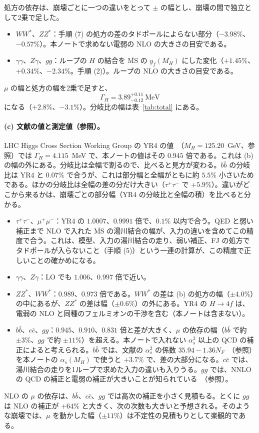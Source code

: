 \documentclass[a4paper,10pt]{ltjsarticle}
\newcommand{\MSbar}{\overline{\mathrm{MS}}}
\begin{document}
処方の依存は、崩壊ごとに一つの違いをとって $\pm$ の幅とし、崩壊の間で独立として2乗で足した。
\begin{itemize}
\item $WW^*$、$ZZ^*$：手順 (7) の処方の差のタドポールによらない部分（$-3.98\%$、$-0.57\%$）。本ノートで求めない電弱の NLO の大きさの目安である。
\item $\gamma\gamma$、$Z\gamma$、$gg$：ループの $H$ の結合を $\MSbar$ の $y_f(M_H)$ にした変化（$+1.45\%$、$+0.34\%$、$-2.34\%$。手順 (2)）。ループの NLO の大きさの目安である。
\end{itemize}
$\mu$ の幅と処方の幅を2乗で足すと、
\begin{equation}
\Gamma_H=3.89^{+0.11}_{-0.12}~\mathrm{MeV}
\label{eq:gammah}
\end{equation}
になる（$+2.8\%$、$-3.1\%$）。分岐比の幅は表~\ref{tab:total} にある。

\paragraph{(c) 文献の値と測定値（参照）。}LHC Higgs Cross Section Working Group の YR4 の値~\cite{yr4}（$M_H=125.20$~GeV、参照）では $\Gamma_H=4.115$~MeV で、本ノートの値はその $0.945$ 倍である。これは (b) の幅の外にある。分岐比は全幅で割るので、比べると見方が変わる。$b\bar b$ の分岐比は YR4 と $0.07\%$ で合うが、これは部分幅と全幅がともに約 $5.5\%$ 小さいためである。ほかの分岐比は全幅の差の分だけ大きい（$\tau^+\tau^-$ で $+5.9\%$）。違いがどこから来るかは、崩壊ごとの部分幅（YR4 の分岐比と全幅の積）を比べると分かる。
\begin{itemize}
\item $\tau^+\tau^-$、$\mu^+\mu^-$：YR4 の $1.0007$、$0.9991$ 倍で、$0.1\%$ 以内で合う。QED と弱い補正まで NLO で入れた $\MSbar$ の湯川結合の幅が、入力の違いを含めてこの精度で合う。これは、模型、入力の湯川結合の走り、弱い補正、FJ の処方でタドポールが入らないこと（手順 (5)）という一連の計算が、この精度で正しいことの確かめになる。
\item $\gamma\gamma$、$Z\gamma$：LO でも $1.006$、$0.997$ 倍で近い。
\item $ZZ^*$、$WW^*$：$0.989$、$0.973$ 倍である。$WW^*$ の差は (b) の処方の幅（$\pm4.0\%$）の中にあるが、$ZZ^*$ の差は幅（$\pm0.6\%$）の外にある。YR4 の $H\to4f$ は、電弱の NLO と同種のフェルミオンの干渉を含む（本ノートは含まない）。
\item $b\bar b$、$c\bar c$、$gg$：$0.945$、$0.910$、$0.831$ 倍と差が大きく、$\mu$ の依存の幅（$b\bar b$ で約 $\pm3\%$、$gg$ で約 $\pm11\%$）を超える。本ノートで入れない $\alpha_s^2$ 以上の QCD の補正によると考えられる。$b\bar b$ では、文献の $\alpha_s^2$ の係数 $35.94-1.36N_F$~\cite{djouadi08}（参照）を本ノートの $\alpha_s(M_H)$ で使うと $+3.7\%$ で、差の大部分になる。$c\bar c$ では、湯川結合の走りを1ループで求めた入力の違いも入りうる。$gg$ では、NNLO の QCD の補正と電弱の補正が大きいことが知られている~\cite{djouadi08}（参照）。
\end{itemize}
NLO の $\mu$ の依存は、$b\bar b$、$c\bar c$、$gg$ では高次の補正を小さく見積もる。とくに $gg$ は NLO の補正が $+64\%$ と大きく、次の次数も大きいと予想される。そのような崩壊では、$\mu$ を動かした幅（$\pm11\%$）は不定性の見積もりとして楽観的である。
\end{document}
